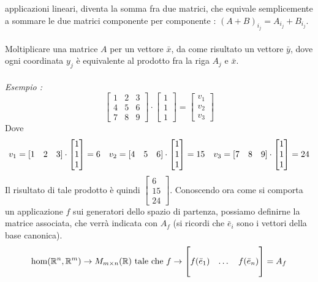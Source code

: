 \documentclass[12pt, letterpaper]{article}
\newcommand{\R}{{\mathbb R}}
\newcommand{\spaz}{{\text{\hphantom{aa}}}}
\newcommand{\acc}{\\\hphantom{}\\}
\begin{document}
applicazioni lineari, diventa la somma fra due matrici, che equivale semplicemente a sommare le due matrici 
componente per componente : \((A+B)_{i_j}=A_{i_j}+B_{i_j}\).\acc 
Moltiplicare una matrice \(A\) per un vettore \(\bar x\), da come risultato un vettore \(\bar y\), dove ogni coordinata \(y_j\) è equivalente 
al prodotto fra la riga \(A_j\) e \(\bar x\). \acc 
\textit{Esempio :}\begin{equation}
    \begin{bmatrix}
    1&2&3\\4&5&6\\7&8&9    
    \end{bmatrix}\cdot\begin{bmatrix}
        1\\1\\1
    \end{bmatrix}=\begin{bmatrix}
        v_1\\v_2\\v_3
    \end{bmatrix}
\end{equation}
Dove \begin{equation}
    v_1 = [1\spaz2\spaz 3]\cdot \begin{bmatrix}
        1\\1\\1
    \end{bmatrix}=6 \spaz v_2 = [4\spaz 5\spaz 6]\cdot \begin{bmatrix}
        1\\1\\1
    \end{bmatrix}=15\spaz v_3 = [7 \spaz8 \spaz9]\cdot \begin{bmatrix}
        1\\1\\1
    \end{bmatrix}=24
\end{equation}
Il risultato di tale prodotto è quindi \(\begin{bmatrix}6\\15\\24\end{bmatrix}\). Conoscendo ora come si comporta un 
applicazione \(f\) sui generatori dello spazio di partenza, possiamo definirne la matrice associata, che verrà indicata 
con \(A_f\) (si ricordi che \(\bar e_i\) sono i vettori della base canonica).
$$\hom(\R^n,\R^m)\rightarrow M_{m\times n}(\R)\text{ tale che }f\rightarrow\begin{bmatrix}             
    \hphantom{}&\hphantom{}&\hphantom{}\\
    f(\bar e_1)&\dots&f(\bar e_n)\\
    \hphantom{}&\hphantom{}&\hphantom{}
\end{bmatrix}=A_f$$
\end{document}
